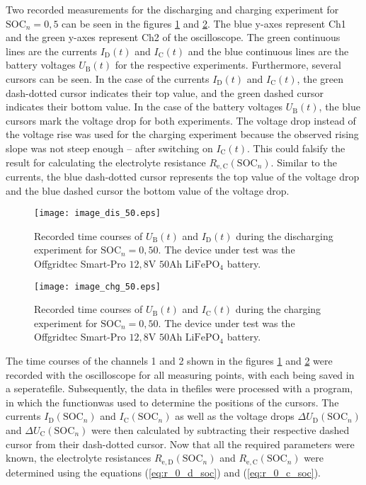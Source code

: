 Two recorded measurements for the discharging and charging experiment for $\mathrm{SOC}_n = 0,5$ can be seen in the figures \ref{fig:image_dis_50} and \ref{fig:image_chg_50}. The blue y-axes represent Ch1 and the green y-axes represent Ch2 of the oscilloscope. The green continuous lines are the currents $I_\mathrm{D}(t)$ and $I_\mathrm{C}(t)$ and the blue continuous lines are the battery voltages $U_\mathrm{B}(t)$ for the respective experiments. Furthermore, several cursors can be seen. In the case of the currents $I_\mathrm{D}(t)$ and $I_\mathrm{C}(t)$, the green dash-dotted cursor indicates their top value, and the green dashed cursor indicates their bottom value. In the case of the battery voltages $U_\mathrm{B}(t)$, the blue cursors mark the voltage drop for both experiments. The voltage drop instead of the voltage rise was used for the charging experiment because the observed rising slope was not steep enough -- after switching on $I_\mathrm{C}(t)$. This could falsify the result for calculating the electrolyte resistance $R_\mathrm{e,C}(\mathrm{SOC}_n)$. Similar to the currents, the blue dash-dotted cursor represents the top value of the voltage drop and the blue dashed cursor the bottom value of the voltage drop. 
\begin{figure}[h!]
	\centering
  	\texttt{[image: image\_dis\_50.eps]}
  	\caption{Recorded time courses of $U_\mathrm{B}(t)$ and $I_\mathrm{D}(t)$ during the discharging experiment for $\mathrm{SOC}_n = 0,50$. The device under test was the Offgridtec Smart-Pro $12,8\mathrm{V}$ $50\mathrm{Ah}$ $\mathrm{LiFePO_4}$ battery.}
	\label{fig:image_dis_50}
\end{figure}
\begin{figure}[h!]
	\centering
  	\texttt{[image: image\_chg\_50.eps]}
	\caption{Recorded time courses of $U_\mathrm{B}(t)$ and $I_\mathrm{C}(t)$ during the charging experiment for $\mathrm{SOC}_n = 0,50$. The device under test was the Offgridtec Smart-Pro $12,8\mathrm{V}$ $50\mathrm{Ah}$ $\mathrm{LiFePO_4}$ battery.}
	\label{fig:image_chg_50}
\end{figure}

The time courses of the channels 1 and 2 shown in the figures \ref{fig:image_dis_50} and \ref{fig:image_chg_50} were recorded with the oscilloscope for all measuring points, with each being saved in a seperatefile. Subsequently, the data in thefiles were processed with a \MATLAB program, in which the functionwas used to determine the positions of the cursors. The currents $I_\mathrm{D}(\mathrm{SOC}_n)$ and $I_\mathrm{C}(\mathrm{SOC}_n)$ as well as the voltage drops $\Delta U_\mathrm{D}(\mathrm{SOC}_n)$ and $\Delta U_\mathrm{C}(\mathrm{SOC}_n)$ were then calculated by subtracting their respective dashed cursor from their dash-dotted cursor. Now that all the required parameters were known, the electrolyte resistances $R_\mathrm{e,D}(\mathrm{SOC}_n)$ and $R_\mathrm{e,C}(\mathrm{SOC}_n)$ were determined using the equations (\ref{eq:r_0_d_soc}) and (\ref{eq:r_0_c_soc}).

